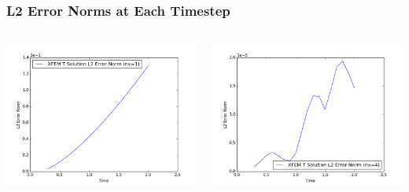 \documentclass[]{beamer}
\begin{document}
\begin{frame}[t]\frametitle{L2 Error Norms at Each Timestep}
  	\begin{columns}
			\begin{center}
			\includegraphics[scale=0.3]{figures/1D_xy_ls1m/1D_xy_ls1mat_nx1_L2_Errs}
			\end{center}
			\begin{center}
			\includegraphics[scale=0.3]{figures/1D_xy_ls1m/1D_xy_ls1mat_nx4_L2_Errs}
			\end{center}
	\end{columns}
\end{frame}
\end{document}
